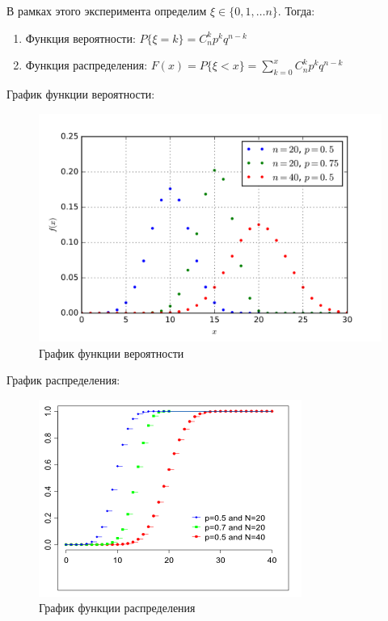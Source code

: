 
\begin{theorem}
    В рамках этого эксперимента определим
    $\xi \in \{0, 1, \dots n\}$.
    Тогда:
    \begin{enumerate}
        \item Функция вероятности: $P\{\xi = k\} = C_n^k p^k q^{n - k}$
        \item Функция распределения: $F(x) = P\{\xi < x\} = \sum\limits_{k = 0}^x C_n^k p^k q^{n - k}$
    \end{enumerate}
\end{theorem}

График функции вероятности:
\begin{figure}[H]
    \centering
    \includegraphics[scale=0.2]{images/binom.png}
    \caption{График функции вероятности}
\end{figure}

График распределения:
\begin{figure}[H]
    \centering
    \includegraphics[scale=0.4]{images/binom2.png}
    \caption{График функции распределения}
\end{figure}

